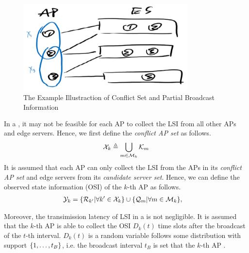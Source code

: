 \begin{figure}[ht]
    \centering
    \includegraphics[width=0.80\textwidth]{images/draft-conflict.png}
    \caption{The Example Illustraction of Conflict Set and Partial Broadcast Information}
    \label{fig:conflict}
\end{figure}

In a , it may not be feasible for each AP to collect the LSI from all other APs and edge servers.
Hence, we first define the \emph{conflict AP set} as follows.
\begin{align}
    \mathcal{X}_{k} \triangleq \bigcup_{m\in\mathcal{M}_{k}} \mathcal{K}_{m}
\end{align}
It is assumed that each AP can only collect the LSI from the APs in its \emph{conflict AP set} and edge servers from its \emph{candidate server set}.
Hence, we can define the observed state information (OSI) of the $k$-th AP as follows.
\begin{align}
    \mathcal{Y}_{k} &= \{\mathcal{R}_{k'} | \forall k'\in\mathcal{X}_{k}\}
                    \cup \{\mathcal{Q}_{m} | \forall m\in\mathcal{M}_{k}\},
\end{align}

Moreover, the transimission latency of LSI in a  is not negligible.
It is assumed that the $k$-th AP is able to collect the OSI $D_{k}(t)$ time slots after the broadcast of the $t$-th interval.
$D_{k}(t)$ is a random variable follows some distribution with support $\{1,\dots,t_B\}$, i.e. the broadcast interval $t_B$ is set that the $k$-th AP .

